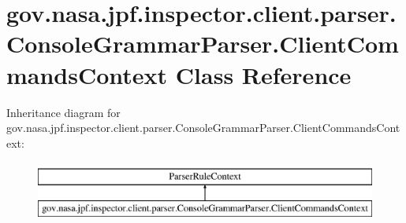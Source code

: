 \hypertarget{classgov_1_1nasa_1_1jpf_1_1inspector_1_1client_1_1parser_1_1_console_grammar_parser_1_1_client_commands_context}{}\section{gov.\+nasa.\+jpf.\+inspector.\+client.\+parser.\+Console\+Grammar\+Parser.\+Client\+Commands\+Context Class Reference}
\label{classgov_1_1nasa_1_1jpf_1_1inspector_1_1client_1_1parser_1_1_console_grammar_parser_1_1_client_commands_context}
Inheritance diagram for gov.\+nasa.\+jpf.\+inspector.\+client.\+parser.\+Console\+Grammar\+Parser.\+Client\+Commands\+Context\+:\begin{figure}[H]
\begin{center}
\leavevmode
\includegraphics[height=2.000000cm]{classgov_1_1nasa_1_1jpf_1_1inspector_1_1client_1_1parser_1_1_console_grammar_parser_1_1_client_commands_context}
\end{center}
\end{figure}
